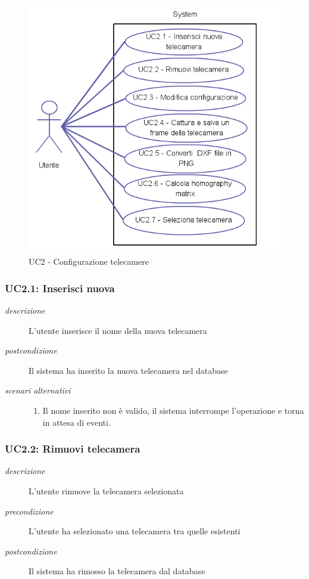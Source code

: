 \begin{figure}[htpb] 
\centering 
\includegraphics[scale=0.4]{./images/uc2.png} 
\caption{UC2 - Configurazione telecamere} 
\label{fig:uc2}
\end{figure} 

\subsubsection{UC2.1: Inserisci nuova} \label{sec:UC2.1}
\begin{description}
\item[\em{descrizione }]L'utente inserisce il nome della nuova telecamera
\item[\em{postcondizione }] Il sistema ha inserito la nuova telecamera nel database
\item[\em{scenari alternativi }] \mbox{} 
\begin{enumerate} 
\item Il nome inserito non è valido, il sistema interrompe l'operazione e torna in attesa di eventi.
\end{enumerate}
\end{description}

\subsubsection{UC2.2: Rimuovi telecamera} \label{sec:UC2.2}
\begin{description}
\item[\em{descrizione }]L'utente rimuove la telecamera selezionata
\item[\em{precondizione }] L'utente ha selezionato una telecamera tra quelle esistenti
\item[\em{postcondizione }] Il sistema ha rimosso la telecamera dal database
\end{description}

